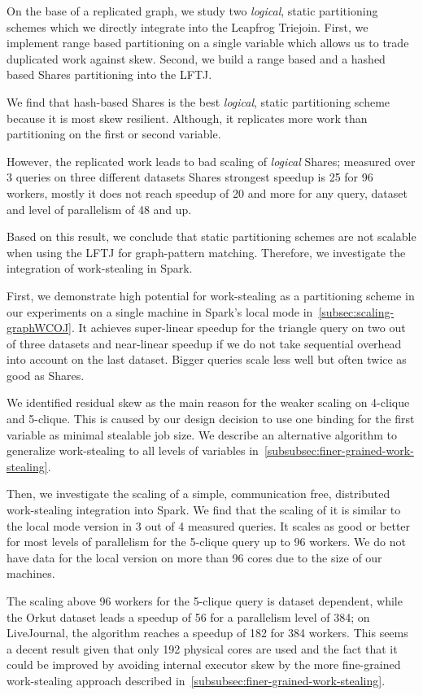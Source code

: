On the base of a replicated graph, we study two \textit{logical}, static partitioning schemes which we directly integrate into the
Leapfrog Triejoin.
First, we implement range based partitioning on a single variable which allows us to trade duplicated work against skew.
Second, we build a range based and a hashed based Shares partitioning into the \textsc{LFTJ}.

We find that hash-based Shares is the best \textit{logical}, static partitioning scheme because it is most skew resilient.
Although, it replicates more work than partitioning on the first or second variable.

However, the replicated work leads to bad scaling of \textit{logical} Shares;
measured over 3 queries on three different datasets Shares strongest speedup is 25 for 96 workers, mostly it does not
reach speedup of 20 and more for any query, dataset and level of parallelism of 48 and up.

Based on this result, we conclude that static partitioning schemes are not scalable when using the \textsc{LFTJ} for graph-pattern
matching.
Therefore, we investigate the integration of work-stealing in Spark.

First, we demonstrate high potential for work-stealing as a partitioning scheme in our experiments on a single machine in Spark's local
mode in~\cref{subsec:scaling-graphWCOJ}.
It achieves super-linear speedup for the triangle query on two out of three datasets and near-linear speedup if we do not take sequential
overhead into account on the last dataset.
Bigger queries scale less well but often twice as good as Shares.

We identified residual skew as the main reason for the weaker scaling on 4-clique and 5-clique.
This is caused by our design decision to use one binding for the first variable as minimal stealable job size.
We describe an alternative algorithm to generalize work-stealing to all levels of variables in~\cref{subsubsec:finer-grained-work-stealing}.

Then, we investigate the scaling of a simple, communication free, distributed work-stealing integration into Spark.
We find that the scaling of it is similar to the local mode version in 3 out of 4 measured queries.
It scales as good or better for most levels of parallelism for the 5-clique query up to 96 workers.
We do not have data for the local version on more than 96 cores due to the size of our machines.

The scaling above 96 workers for the 5-clique query is dataset dependent, while
the Orkut dataset leads a speedup of 56 for a parallelism level of 384;
on LiveJournal, the algorithm reaches a speedup of 182 for 384 workers.
This seems a decent result given that only 192 physical cores are used and the fact that
it could be improved by avoiding internal executor skew by the more fine-grained work-stealing
approach described in~\cref{subsubsec:finer-grained-work-stealing}.

